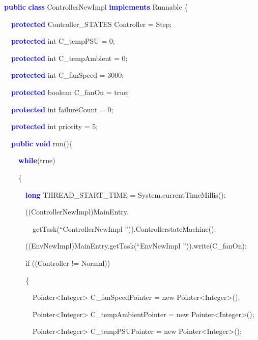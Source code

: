 \documentclass[a4paper]{article}
\title{}
\author{Andy }
\date{2013-08-07}
\begin{document}
\clearpage\setcounter{page}{1}\pagestyle{LeftPage}
\thispagestyle{RightPage}
{\ttfamily
\textbf{\textcolor{blue}{public}} \textbf{\textcolor{blue}{class}}
ControllerNewImpl \textbf{\textcolor{blue}{implements}} Runnable \{}

{\ttfamily
\ \ \textbf{\textcolor{blue}{protected}} Controller\_STATES Controller =
Step;}

{\ttfamily
\ \ \textbf{\textcolor{blue}{protected}} int C\_tempPSU = 0;}

{\ttfamily
\ \ \textbf{\textcolor{blue}{protected}} int C\_tempAmbient = 0;}

{\ttfamily
\ \ \textbf{\textcolor{blue}{protected}} int C\_fanSpeed = 3000;}

{\ttfamily
\ \ \textbf{\textcolor{blue}{protected}} boolean C\_fanOn = true;}

{\ttfamily
\ \ \textbf{\textcolor{blue}{protected}} int failureCount = 0;}

{\ttfamily
\ \ \textbf{\textcolor{blue}{protected}} int priority = 5;}


\bigskip

{\ttfamily
\ \ \textbf{\textcolor{blue}{public}} \textbf{\textcolor{blue}{void}}
run()\{}

{\ttfamily
\ \ \ \ \textbf{\textcolor{blue}{while}}(true)}

{\ttfamily
\ \ \ \ \{}

{\ttfamily
\ \ \ \ \ \ \textbf{\textcolor{blue}{long}} THREAD\_START\_TIME =
System.currentTimeMillis();}

{\ttfamily
\ \ \ \ \ \ ((ControllerNewImpl)MainEntry.}

{\ttfamily
\ \ \ \ \ \ \ \ getTask(``ControllerNewImpl '')).ControllerstateMachine();}

{\ttfamily
\ \ \ \ \ \ ((EnvNewImpl)MainEntry.getTask(``EnvNewImpl '')).write(C\_fanOn);}

{\ttfamily
\ \ \ \ \ \ if ((Controller != Normal))}

{\ttfamily
\ \ \ \ \ \ \{}

{\ttfamily
\ \ \ \ \ \ \ \ Pointer{\textless}Integer{\textgreater}
C\_fanSpeedPointer = new Pointer{\textless}Integer{\textgreater}();}

{\ttfamily
\ \ \ \ \ \ \ \ Pointer{\textless}Integer{\textgreater}
C\_tempAmbientPointer = new Pointer{\textless}Integer{\textgreater}();}

{\ttfamily
\ \ \ \ \ \ \ \ Pointer{\textless}Integer{\textgreater}
C\_tempPSUPointer = new Pointer{\textless}Integer{\textgreater}();}
\end{document}
